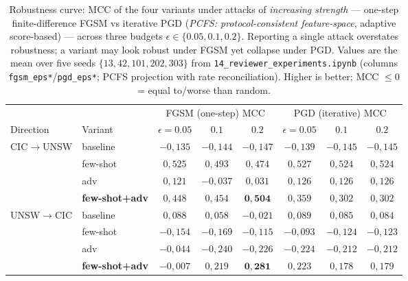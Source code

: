 \documentclass[11pt,a4paper]{article}
\begin{document}
\begin{table}[h]
\centering
\caption{Robustness curve: MCC of the four variants under attacks of \emph{increasing
strength} --- one-step finite-difference FGSM vs iterative PGD
(\emph{PCFS: protocol-consistent feature-space}, adaptive score-based) --- across three budgets
$\epsilon\in\{0.05,0.1,0.2\}$. Reporting a single attack overstates robustness; a
variant may look robust under FGSM yet collapse under PGD. Values are the mean over
five seeds $\{13,42,101,202,303\}$ from \texttt{14\_reviewer\_experiments.ipynb}
(columns \texttt{fgsm\_eps*}/\texttt{pgd\_eps*}; PCFS projection with rate
reconciliation). Higher is better; MCC $\le 0$ = equal to/worse than random.}
\label{tab:multiattack}
\small
\begin{tabular}{llcccccc}
\toprule
& & \multicolumn{3}{c}{FGSM (one-step) MCC} & \multicolumn{3}{c}{PGD (iterative) MCC} \\
\cmidrule(lr){3-5}\cmidrule(lr){6-8}
Direction & Variant & $\epsilon{=}0.05$ & $0.1$ & $0.2$ & $\epsilon{=}0.05$ & $0.1$ & $0.2$ \\
\midrule
\multirow{4}{*}{CIC$\rightarrow$UNSW}
 & baseline               & $-0{,}135$ & $-0{,}144$ & $-0{,}147$ & $-0{,}139$ & $-0{,}145$ & $-0{,}145$ \\
 & few-shot               & $0{,}525$ & $0{,}493$ & $0{,}474$ & $0{,}527$ & $0{,}524$ & $0{,}524$ \\
 & adv                    & $0{,}121$ & $-0{,}037$ & $0{,}031$ & $0{,}126$ & $0{,}126$ & $0{,}126$ \\
 & \textbf{few-shot+adv}  & $0{,}448$ & $0{,}454$ & $\mathbf{0{,}504}$ & $0{,}359$ & $0{,}302$ & $0{,}302$ \\
\midrule
\multirow{4}{*}{UNSW$\rightarrow$CIC}
 & baseline               & $0{,}088$ & $0{,}058$ & $-0{,}021$ & $0{,}089$ & $0{,}085$ & $0{,}084$ \\
 & few-shot               & $-0{,}154$ & $-0{,}169$ & $-0{,}115$ & $-0{,}093$ & $-0{,}124$ & $-0{,}123$ \\
 & adv                    & $-0{,}044$ & $-0{,}240$ & $-0{,}226$ & $-0{,}224$ & $-0{,}212$ & $-0{,}212$ \\
 & \textbf{few-shot+adv}  & $-0{,}007$ & $0{,}219$ & $\mathbf{0{,}281}$ & $0{,}223$ & $0{,}178$ & $0{,}179$ \\
\bottomrule
\end{tabular}
\end{table}
\end{document}
